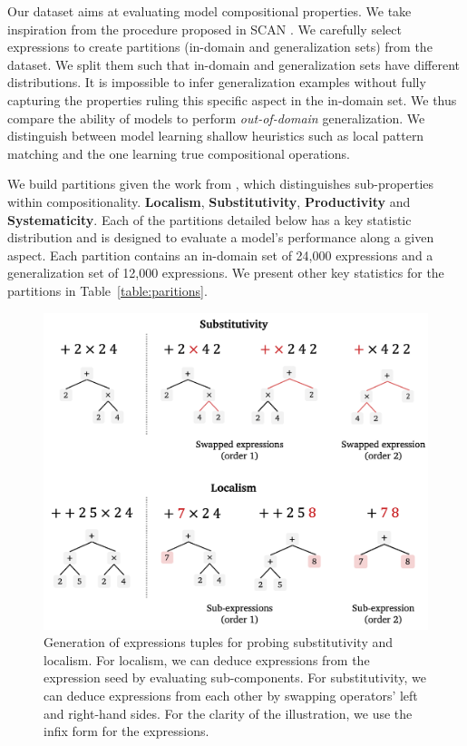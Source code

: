 Our dataset aims at evaluating model compositional properties. We take inspiration from the procedure proposed in SCAN \parencite{lake_18, loula_18}. We carefully select expressions to create partitions (in-domain and generalization sets) from the dataset. We split them such that in-domain and generalization sets have different distributions. It is impossible to infer generalization examples without fully capturing the properties ruling this specific aspect in the in-domain set. We thus compare the ability of models to perform \textit{out-of-domain} generalization. We distinguish between model learning shallow heuristics such as local pattern matching and the one learning true compositional operations.

We build partitions given the work from \textcite{hupkes_20}, which distinguishes sub-properties within compositionality. \textbf{Localism}, \textbf{Substitutivity}, \textbf{Productivity} and \textbf{Systematicity}. Each of the partitions detailed below has a key statistic distribution and is designed to evaluate a model's performance along a given aspect. Each partition contains an in-domain set of 24,000 expressions and a generalization set of 12,000 expressions. We present other key statistics for the partitions in Table~\ref{table:paritions}. 

\begin{figure}[htb!]
    \centering
    \includegraphics[width=\textwidth]{images/loc_prod_6.png}
    \caption{Generation of expressions tuples for probing substitutivity and localism. For localism, we can deduce expressions from the expression seed by evaluating sub-components. For substitutivity, we can deduce expressions from each other by swapping operators' left and right-hand sides. For the clarity of the illustration, we use the infix form for the expressions.}
\end{figure}

